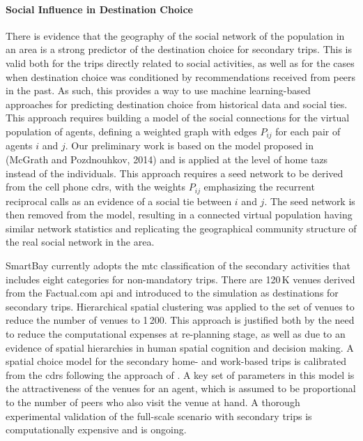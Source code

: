 \paragraph{Social Influence in Destination Choice}
There is evidence that the geography of the social network of the population in an area is a strong predictor of the destination choice for secondary trips. This is valid both for the trips directly related to social activities, as well as for the cases when destination choice was conditioned by recommendations received from peers in the past. As such, this provides a way to use machine learning-based approaches for predicting destination choice from historical data and social ties. This approach requires building a model of the social connections for the virtual population of agents, \ie defining a weighted graph with edges $P_{ij}$ for each pair of agents $i$ and $j$. Our preliminary work is based on the model proposed in (McGrath and Pozdnouhkov, 2014) and is applied at the level of home \glspl{taz} instead of the individuals. This approach requires a seed network to be derived from the cell phone \glspl{cdr}, with the weights $P_{ij}$ emphasizing the recurrent reciprocal calls as an evidence of a social tie between $i$ and $j$. The seed network is then removed from the model, resulting in a connected virtual population having similar network statistics and replicating the geographical community structure of the real social network in the area. 

SmartBay currently adopts the \gls{mtc} classification of the secondary activities that includes eight categories for non-mandatory trips. There are 120\,K venues derived from the Factual.com \gls{api} and introduced to the simulation as destinations for secondary trips. Hierarchical spatial clustering was applied to the set of venues to reduce the number of venues to 1\,200. This approach is justified both by the need to reduce the computational expenses at re-planning stage, as well as due to an evidence of spatial hierarchies in human spatial cognition and decision making. A spatial choice model for the secondary home- and work-based trips is calibrated from the \glspl{cdr} following the approach of \citet[][]{McArdleEtAl_ACMTIS_2014}. A key set of parameters in this model is the attractiveness of the venues for an agent, which is assumed to be proportional to the number of peers who also visit the venue at hand. A thorough experimental validation of the full-scale scenario with secondary trips is computationally expensive and is ongoing.

